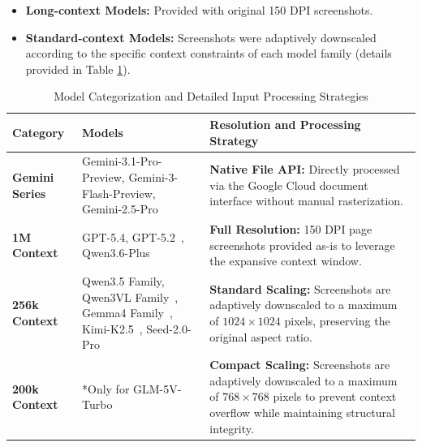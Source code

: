 \documentclass{llmxive}
\begin{document}
{{{\begin{itemize}
 \item \textbf{Long-context Models:} Provided with original 150 DPI screenshots.
 \item \textbf{Standard-context Models:} Screenshots were adaptively downscaled according to the specific context constraints of each model family (details provided in Table \ref{tab:appendix_model_specs}).
\end{itemize}

\begin{table}[htbp]
\centering
\small
\begin{tabularx}{\textwidth}{l p{3.5cm} X}
\toprule
\textbf{Category} & \textbf{Models} & \textbf{Resolution and Processing Strategy} \\
\midrule
\textbf{Gemini Series~\citep{team2023gemini}} & Gemini-3.1-Pro-Preview, \newline Gemini-3-Flash-Preview, \newline Gemini-2.5-Pro & \textbf{Native File API:} Directly processed via the Google Cloud document interface without manual rasterization. \\
\midrule
\textbf{1M Context} & GPT-5.4, GPT-5.2~\citep{achiam2023gpt}, \newline Qwen3.6-Plus & \textbf{Full Resolution:} 150 DPI page screenshots provided as-is to leverage the expansive context window. \\
\midrule
\textbf{256k Context} & Qwen3.5 Family, \newline Qwen3VL Family~\citep{bai2025qwen3}, \newline Gemma4 Family~\citep{team2024gemma}, \newline Kimi-K2.5~\citep{team2024gemma}, \newline Seed-2.0-Pro~\citep{seed2026seed18modelcardgeneralized} & \textbf{Standard Scaling:} Screenshots are adaptively downscaled to a maximum of $1024 \times 1024$ pixels, preserving the original aspect ratio. \\
\midrule
\textbf{200k Context} & *Only for \newline GLM-5V-Turbo~\citep{zeng2026glm} & \textbf{Compact Scaling:} Screenshots are adaptively downscaled to a maximum of $768 \times 768$ pixels to prevent context overflow while maintaining structural integrity. \\
\bottomrule
\end{tabularx}
\caption{Model Categorization and Detailed Input Processing Strategies}
\label{tab:appendix_model_specs}
\end{table}

}}}
\end{document}
